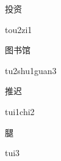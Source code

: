 \begin{verbete}[tou2zi1]{投资}
\begin{pronuncia}{tou2zi1}
\end{pronuncia}
\end{verbete}

\begin{verbete}{图书馆}
\begin{pronuncia}{tu2shu1guan3}
\end{pronuncia}
\end{verbete}

\begin{verbete}{推迟}
\begin{pronuncia}{tui1chi2}
\end{pronuncia}
\end{verbete}

\begin{verbete}[tui3]{腿}
\begin{pronuncia}{tui3}
\end{pronuncia}
\end{verbete}

